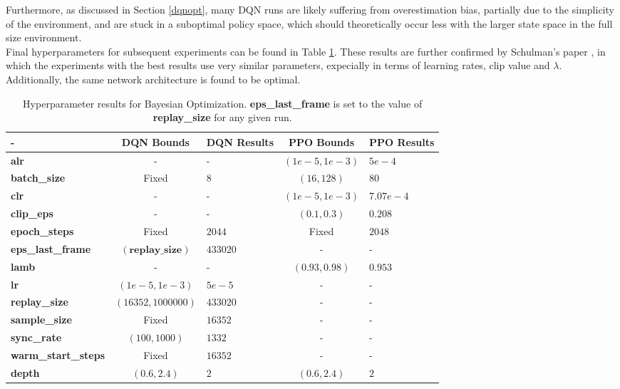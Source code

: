 \documentclass[12pt]{article}
\begin{document}
Furthermore, as discussed in Section \ref{dqnopt}, many DQN runs are likely suffering from overestimation bias, partially due to the simplicity of the environment, and are stuck in a suboptimal policy space, which should theoretically occur less with the larger state space in the full size environment.\\\newline
Final hyperparameters for subsequent experiments can be found in Table \ref{results}. These results are further confirmed by Schulman's paper \autocite{schulman2017proximal}, in which the experiments with the best results use very similar parameters, expecially in terms of learning rates, clip value and $\lambda$. Additionally, the same network architecture is found to be optimal. 
\begin{table}[H]
    \centering
    \begin{tabularx}{\columnwidth} { l | c | X | c| X }
        - & DQN Bounds & DQN Results & PPO Bounds & PPO Results\\
       \hline
       \textbf{alr}  & - & - & $(1e-5,1e-3)$ & $5e-4$  \\
       \textbf{batch\_size}  & Fixed & $8$ & $(16,128)$ & $80$  \\
       \textbf{clr}  & -  & - & $(1e-5,1e-3)$ & $7.07e-4$  \\
       \textbf{clip\_eps}  & -  & - & $(0.1,0.3)$ & $0.208$  \\
       \textbf{epoch\_steps}  & Fixed  & $2044$ & Fixed & $2048$  \\
       \textbf{eps\_last\_frame}  & $(\textbf{replay\_size})$ & $433020$ & - & -  \\
       \textbf{lamb}  & -  & - & $(0.93,0.98)$ & $0.953$  \\
       \textbf{lr}  & $(1e-5,1e-3)$  & $5e-5$ & - & -  \\
       \textbf{replay\_size}  & $(16352,1000000)$ & $433020$ & - & -  \\
       \textbf{sample\_size}  & Fixed & $16352$ & - & -  \\
       \textbf{sync\_rate}  & $(100,1000)$  & $1332$ & - & -  \\
       \textbf{warm\_start\_steps}  & Fixed  & $16352$ & - & - \\
       \textbf{depth} & $(0.6,2.4)$ & $2$ & $(0.6,2.4)$ & $2$
      \end{tabularx}
      \caption{\label{results}Hyperparameter results  for Bayesian Optimization. \textbf{eps\_last\_frame} is set to the value of \textbf{replay\_size} for any given run.}
\end{table}
\end{document}
